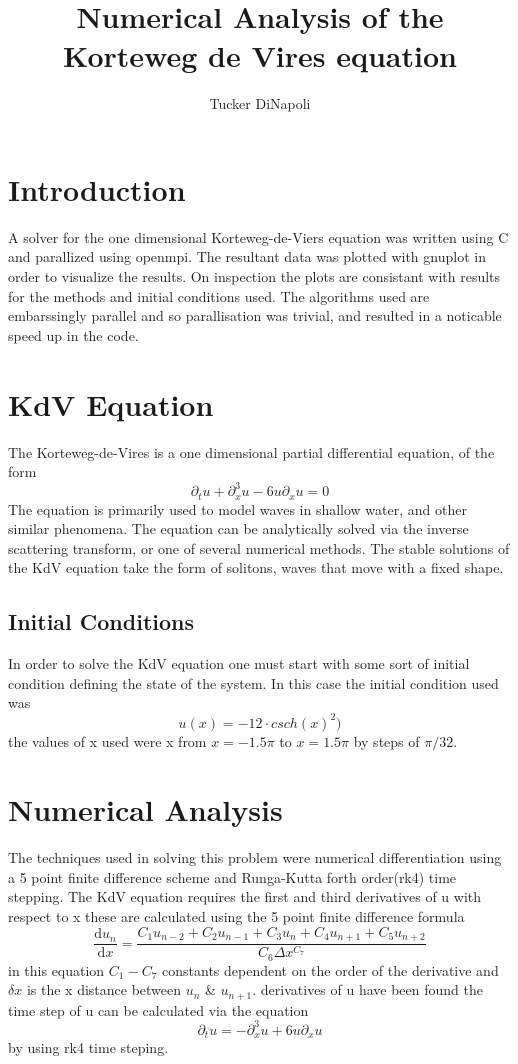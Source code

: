 \documentclass{article}
\author{Tucker DiNapoli}
\title{Numerical Analysis of the Korteweg de Vires equation}
\begin{document}
\maketitle
\section{Introduction}
A solver for the one dimensional Korteweg-de-Viers equation was written using C
and parallized using openmpi. The resultant data was plotted with gnuplot in
order to visualize the results. On inspection the plots are consistant with
results for the methods and initial conditions used. The algorithms used are
embarssingly parallel and so parallisation was trivial, and resulted in a
noticable speed up in the code.
\section{KdV Equation}
The Korteweg-de-Vires is a one dimensional partial differential
equation, of the form \[\partial_tu+\partial_x^3u-6u\partial_xu=0\]
The equation is primarily used to model waves in shallow water, and other
similar phenomena. The equation can be analytically solved via the
inverse scattering transform, or one of several numerical methods. The
stable solutions of the KdV equation take the form of solitons, waves
that move with a fixed shape.
\subsection{Initial Conditions}
In order to solve the KdV equation one must start with some sort of
initial condition defining the state of the system. In this case the
initial condition used was \[u(x)=-12\cdot csch(x)^2)\] the values of
x used were x from \(x=-1.5\pi\) to \(x=1.5\pi\) by steps of
\(\pi/32\).

\section{Numerical Analysis}
The techniques used in solving this problem were numerical differentiation
using a 5 point finite difference scheme and Runga-Kutta forth order(rk4) time
stepping. The KdV equation requires the first and third derivatives of u with
respect to x these are calculated using the 5 point finite difference formula
\[\frac{\mathrm{d} u_n}{\mathrm{d}
x}=\frac{C_1u_{n-2}+C_2u_{n-1}+C_3u_n+C_4u_{n+1}+C_5u_{n+2}}{C_6\Delta
x^{C_7}}\] in this equation \(C_1-C_7\) constants dependent on the order of the
derivative and \(\delta x\) is the x distance between \(u_n\) \&
\(u_{n+1}\). %
derivatives of u have been found the time step of u can be calculated via the
equation \[\partial_tu=-\partial_x^3u+6u\partial_xu\] by using rk4 time
steping.%
\end{document}
